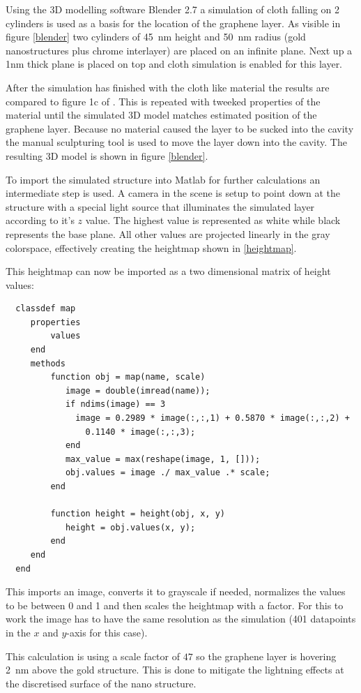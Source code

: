 Using the 3D modelling software Blender 2.7 a simulation of cloth falling on 2 cylinders is used as a basis for the location of the graphene layer. As visible in figure \ref{blender} two cylinders of \SI{45}{nm} height and \SI{50}{nm} radius (gold nanostructures plus chrome interlayer) are placed on an infinite plane. Next up a 1nm thick plane is placed on top and cloth simulation is enabled for this layer.

After the simulation has finished with the cloth like material the results are compared to figure 1c of \cite{heeg}. This is repeated with tweeked properties of the material until the simulated 3D model matches estimated position of the graphene layer. Because no material caused the layer to be sucked into the cavity the manual sculpturing tool is used to move the layer down into the cavity. The resulting 3D model is shown in figure \ref{blender}.

To import the simulated structure into Matlab for further calculations an intermediate step is used. A camera in the scene is setup to point down at the structure with a special light source that illuminates the simulated layer according to it's $z$ value. The highest value is represented as white while black represents the base plane. All other values are projected linearly in the gray colorspace, effectively creating the heightmap shown in \ref{heightmap}.

This heightmap can now be imported as a two dimensional matrix of height values:
\begin{verbatim}
  classdef map
     properties
         values
     end
     methods
         function obj = map(name, scale)
            image = double(imread(name));
            if ndims(image) == 3
              image = 0.2989 * image(:,:,1) + 0.5870 * image(:,:,2) +
                0.1140 * image(:,:,3);
            end
            max_value = max(reshape(image, 1, []));
            obj.values = image ./ max_value .* scale;
         end

         function height = height(obj, x, y)
            height = obj.values(x, y);
         end
     end
  end
\end{verbatim}

This imports an image, converts it to grayscale if needed, normalizes the values to be between 0 and 1 and then scales the heightmap with a factor. For this to work the image has to have the same resolution as the simulation (401 datapoints in the $x$ and $y$-axis for this case).

This calculation is using a scale factor of $47$ so the graphene layer is hovering \SI{2}{nm} above the gold structure. This is done to mitigate the lightning effects at the discretised surface of the nano structure.
